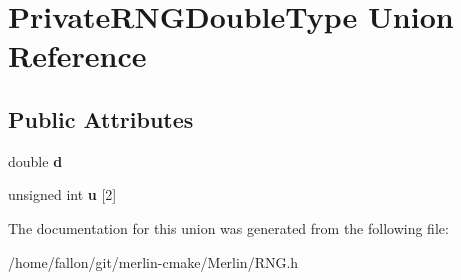 \hypertarget{unionPrivateRNGDoubleType}{}\section{Private\+R\+N\+G\+Double\+Type Union Reference}
\label{unionPrivateRNGDoubleType}
\subsection*{Public Attributes}
\begin{DoxyCompactItemize}
\item 
\mbox{\label{unionPrivateRNGDoubleType_afe2829e8aa988ecd2b1fc288aef50da0}} 
double {\bfseries d}
\item 
\mbox{\label{unionPrivateRNGDoubleType_a66326fd8ea0db21ee59df9bae71c7d58}} 
unsigned int {\bfseries u} \mbox{[}2\mbox{]}
\end{DoxyCompactItemize}


The documentation for this union was generated from the following file\+:\begin{DoxyCompactItemize}
\item 
/home/fallon/git/merlin-\/cmake/\+Merlin/R\+N\+G.\+h\end{DoxyCompactItemize}
